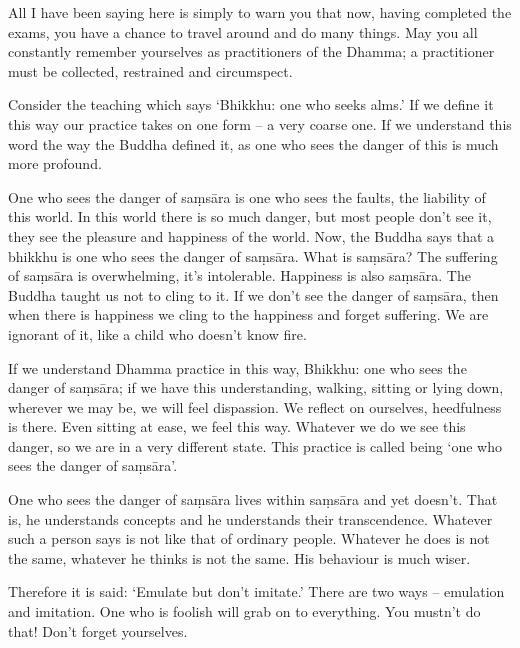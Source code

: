 All I have been saying here is simply to warn you that now, having completed the exams, you have a chance to travel around and do many things. May you all constantly remember yourselves as practitioners of the Dhamma; a practitioner must be collected, restrained and circumspect.

Consider the teaching which says `Bhikkhu: one who seeks alms.' If we define it this way our practice takes on one form -- a very coarse one. If we understand this word the way the Buddha defined it, as one who sees the danger of  this is much more profound.

One who sees the danger of sa\d{m}s\=ara is one who sees the faults, the liability of this world. In this world there is so much danger, but most people don't see it, they see the pleasure and happiness of the world. Now, the Buddha says that a bhikkhu is one who sees the danger of sa\d{m}s\=ara. What is sa\d{m}s\=ara? The suffering of sa\d{m}s\=ara is overwhelming, it's intolerable. Happiness is also sa\d{m}s\=ara. The Buddha taught us not to cling to it. If we don't see the danger of sa\d{m}s\=ara, then when there is happiness we cling to the happiness and forget suffering. We are ignorant of it, like a child who doesn't know fire.

If we understand Dhamma practice in this way, Bhikkhu: one who sees the danger of sa\d{m}s\=ara; if we have this understanding, walking, sitting or lying down, wherever we may be, we will feel dispassion. We reflect on ourselves, heedfulness is there. Even sitting at ease, we feel this way. Whatever we do we see this danger, so we are in a very different state. This practice is called being `one who sees the danger of sa\d{m}s\=ara'.

One who sees the danger of sa\d{m}s\=ara lives within sa\d{m}s\=ara and yet doesn't. That is, he understands concepts and he understands their transcendence. Whatever such a person says is not like that of ordinary people. Whatever he does is not the same, whatever he thinks is not the same. His behaviour is much wiser.

Therefore it is said: `Emulate but don't imitate.' There are two ways -- emulation and imitation. One who is foolish will grab on to everything. You mustn't do that! Don't forget yourselves.

